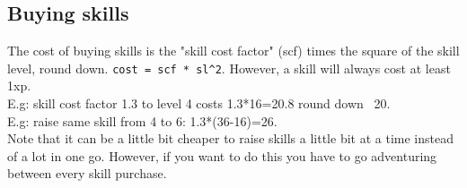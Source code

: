 \subsection*{Buying skills}
The cost of buying skills is the "skill cost factor" (scf) times the square of the skill level, round down. \verb|cost = scf * sl^2|. However, a skill will always cost at least 1xp. \\
E.g: skill cost factor 1.3 to level 4 costs 1.3*16=20.8 round down ~20. \\
E.g: raise same skill from 4 to 6: 1.3*(36-16)=26. \\
Note that it can be a little bit cheaper to raise skills a little bit at a time instead of a lot in one go. However, if you want to do this you have to go adventuring between every skill purchase. \\
 \\








